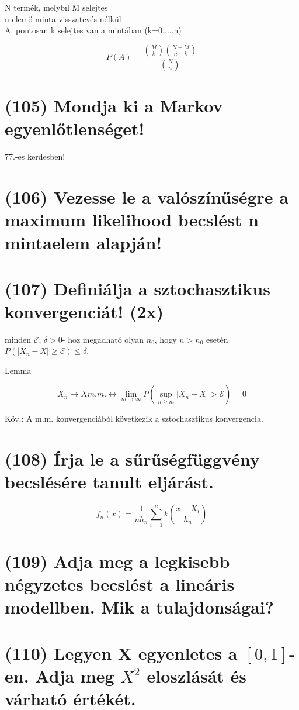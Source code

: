 \documentclass[12p]{article}
\begin{document}
N termék, melybıl M selejtes\\
n elemő minta visszatevés nélkül\\
A: pontosan k selejtes van a mintában
(k=0,...,n)

$$P(A) = \frac{{M \choose k}{{N - M} \choose {n - k}}}{{N \choose n}}$$

\section{(105) Mondja ki a Markov egyenlőtlenséget!}

77.-es kerdesben!

\section{(106) Vezesse le a valószínűségre a maximum likelihood becslést n mintaelem alapján!}

\section{(107) Definiálja a sztochasztikus konvergenciát! (2x)}

 minden $\mathcal{E}$, $\delta>0$-
hoz megadható olyan $n_0$, hogy $n>n_0$ esetén $P(|X_n-X| \geq \mathcal{E}) \leq \delta$.

Lemma

$$X_n \rightarrow X m.m. \leftrightarrow \lim_{m \rightarrow \infty} P(\sup_{n \geq m} |X_n - X| > \mathcal{E}) = 0$$

Köv.: A m.m. konvergenciából következik a
sztochasztikus konvergencia.


\section{(108) Írja le a sűrűségfüggvény becslésére tanult eljárást.}

$$f_n(x) = \frac{1}{nh_n}\sum^n_{i=1}k\left( \frac{x-X_i}{h_n} \right)$$

\section{(109) Adja meg a legkisebb négyzetes becslést a lineáris modellben. Mik a tulajdonságai?}

\section{(110) Legyen X egyenletes a $[0, 1]$-en. Adja meg $X^2$ eloszlását és várható értékét.}
\end{document}
